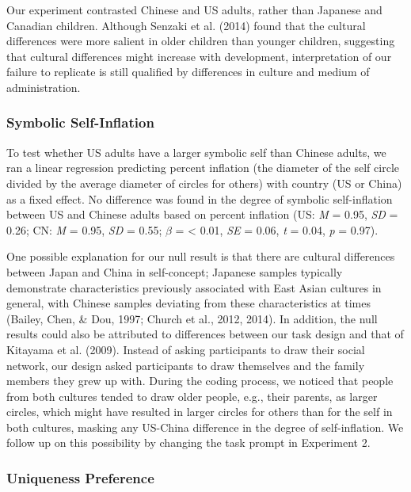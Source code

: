 \documentclass[
  man,floatsintext]{apa6}
\begin{document}
Our experiment contrasted Chinese and US adults, rather than Japanese and Canadian children. Although Senzaki et al. (2014) found that the cultural differences were more salient in older children than younger children, suggesting that cultural differences might increase with development, interpretation of our failure to replicate is still qualified by differences in culture and medium of administration.

\hypertarget{symbolic-self-inflation-1}{%
\subsubsection{Symbolic Self-Inflation}\label{symbolic-self-inflation-1}}

To test whether US adults have a larger symbolic self than Chinese adults, we ran a linear regression predicting percent inflation (the diameter of the self circle divided by the average diameter of circles for others) with country (US or China) as a fixed effect. No difference was found in the degree of symbolic self-inflation between US and Chinese adults based on percent inflation (US: \emph{M} = 0.95, \emph{SD} = 0.26; CN: \emph{M} = 0.95, \emph{SD} = 0.55; \(\beta\) = \textless{} 0.01, \emph{SE} = 0.06, \emph{t} = 0.04, \emph{p} = 0.97).

One possible explanation for our null result is that there are cultural differences between Japan and China in self-concept; Japanese samples typically demonstrate characteristics previously associated with East Asian cultures in general, with Chinese samples deviating from these characteristics at times (Bailey, Chen, \& Dou, 1997; Church et al., 2012, 2014). In addition, the null results could also be attributed to differences between our task design and that of Kitayama et al. (2009). Instead of asking participants to draw their social network, our design asked participants to draw themselves and the family members they grew up with. During the coding process, we noticed that people from both cultures tended to draw older people, e.g., their parents, as larger circles, which might have resulted in larger circles for others than for the self in both cultures, masking any US-China difference in the degree of self-inflation. We follow up on this possibility by changing the task prompt in Experiment 2.

\hypertarget{uniqueness-preference-1}{%
\subsubsection{Uniqueness Preference}\label{uniqueness-preference-1}}
\end{document}
